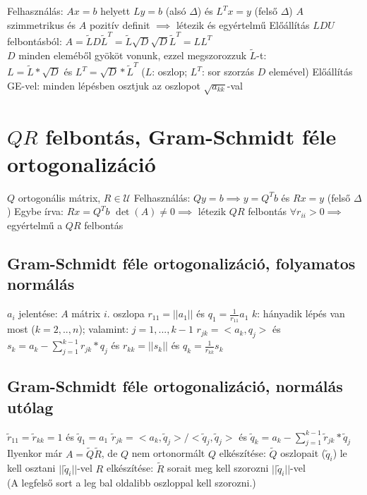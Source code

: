 \documentclass[12pt,a4paper]{article}
\begin{document}
\begin{outline}
	\1 Felhasználás: $Ax=b$ helyett $Ly=b$ (alsó $\Delta$) és $L^Tx=y$ (felső $\Delta$)
	\1 $A$ szimmetrikus és $A$ pozitív definit $\implies$ létezik és egyértelmű
	\1 Előállítás $LDU$ felbontásból: $A = \widetilde{L}D\widetilde{L}^T =
	\widetilde{L} \sqrt{D} \sqrt{D} \widetilde{L}^T = LL^T$\\
	$D$ minden eleméből gyököt vonunk, ezzel megszorozzuk $\widetilde{L}$-t:\\
	$L = \widetilde{L} * \sqrt{D}$ és $L^T = \sqrt{D} * \widetilde{L}^T$
	($L$: oszlop; $L^T$: sor szorzás $D$ elemével)
	\1 Előállítás GE-vel: minden lépésben osztjuk az oszlopot $\sqrt{a_{kk}}$-val
\end{outline}

\pagebreak

\section{$QR$ felbontás, Gram-Schmidt féle ortogonalizáció}

\begin{outline}
	\1 $Q$ ortogonális mátrix, $R \in \mathcal{U}$
	\1 Felhasználás: $Qy = b \implies y = Q^Tb$ és $Rx = y$ (felső $\Delta$)
		\2 Egybe írva: $Rx = Q^Tb$
	\1 $\det(A) \ne 0 \implies$ létezik $QR$ felbontás
		\2 $\forall r_{ii} > 0 \implies$ egyértelmű a $QR$ felbontás
\end{outline}

\subsection{Gram-Schmidt féle ortogonalizáció, folyamatos normálás}

\begin{outline}
	\1 $a_i$ jelentése: $A$ mátrix $i.$ oszlopa
	\1 $r_{11} = ||a_1||$ és $q_1 = \frac{1}{r_{11}} a_1$
	\1 $k$: hányadik lépés van most ($k=2,..,n$); valamint: $j = 1,...,k-1$
	\1 $r_{jk} = <a_k,q_j>$
	és $s_k = a_k - \sum_{j=1}^{k-1} r_{jk} * q_j$
	és $r_{kk} = ||s_k||$
	és $q_k = \frac{1}{r_{kk}}s_k$
\end{outline}

\subsection{Gram-Schmidt féle ortogonalizáció, normálás utólag}

\begin{outline}
	\1 $\widetilde{r}_{11} = \widetilde{r}_{kk} = 1$ és $\widetilde{q}_1 = a_1$
	\1 $\widetilde{r}_{jk} = <a_k,\widetilde{q}_j> / <\widetilde{q}_j,\widetilde{q}_j>$
	\; és \; $\widetilde{q}_k = a_k - \sum_{j=1}^{k-1} \widetilde{r}_{jk} * \widetilde{q}_j$
	\1 Ilyenkor már $A=\widetilde{Q}\widetilde{R}$, de $Q$ nem ortonormált
	\1 $Q$ elkészítése: $\widetilde{Q}$ oszlopait ($\widetilde{q}_i$)
	le kell osztani $||\widetilde{q}_i||$-vel
	\1 $R$ elkészítése: $\widetilde{R}$ sorait meg kell szorozni $||\widetilde{q}_i||$-vel\\
	(A legfelső sort a leg bal oldalibb oszloppal kell szorozni.)
\end{outline}
\end{document}
